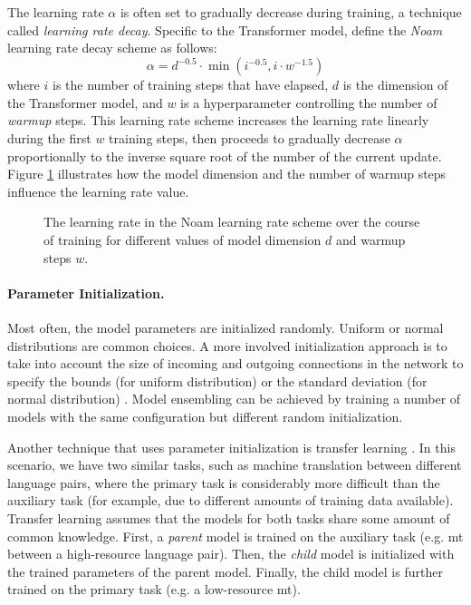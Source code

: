The learning rate $\alpha$ is often set to gradually decrease during training,
a technique called \emph{learning rate decay}. Specific to the Transformer
model, \citet{vaswani2017attention} define the \emph{Noam} learning rate decay
scheme as follows:
%
\begin{equation}
  \alpha =  d^{-0.5} \cdot \min( i^{-0.5}, i \cdot  w^{-1.5})
\end{equation}
%
where $i$ is the number of training steps that have elapsed, $d$ is the
dimension of the Transformer model, and $w$ is a hyperparameter controlling the
number of \emph{warmup} steps. This learning rate scheme increases the learning
rate linearly during the first $w$ training steps, then proceeds to gradually
decrease $\alpha$ proportionally to the inverse square root of the number of
the current update. Figure \ref{fig:noam} illustrates how the model dimension
and the number of warmup steps influence the learning rate value.

\begin{figure}
  \centering
  

  \caption{The learning rate in the Noam learning rate scheme over the course
    of training for different values of model dimension $d$ and warmup steps
    $w$.}
  \label{fig:noam}
\end{figure}

\paragraph{Parameter Initialization.}
Most often, the model parameters are initialized randomly. Uniform or normal
distributions are common choices. A more involved initialization approach is to
take into account the size of incoming and outgoing connections in the network
to specify the bounds (for uniform distribution) or the standard deviation (for
normal distribution) \citep{glorot2010understanding}.  Model ensembling can be
achieved by training a number of models with the same configuration but
different random initialization.

Another technique that uses parameter initialization is transfer learning
\citep{zoph-etal-2016-transfer}. In this scenario, we have two similar tasks,
such as machine translation between different language pairs, where the primary
task is considerably more difficult than the auxiliary task (for example, due
to different amounts of training data available). Transfer learning assumes
that the models for both tasks share some amount of common knowledge. First, a
\emph{parent} model is trained on the auxiliary task (e.g. \ac{mt} between a
high-resource language pair). Then, the \emph{child} model is initialized with
the trained parameters of the parent model. Finally, the child model is further
trained on the primary task (e.g. a low-resource \ac{mt}).

